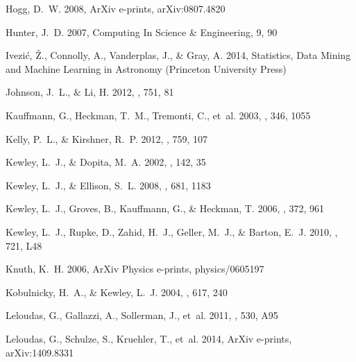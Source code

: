 \documentclass{emulateapj} \usepackage{amsmath} \usepackage{float}
\begin{document}
\begin{thebibliography}{}
{Hogg}, D.~W. 2008, ArXiv e-prints, arXiv:0807.4820

Hunter, J.~D. 2007, Computing In Science \& Engineering, 9, 90

{Ivezi{\'c}}, {\v Z}., {Connolly}, A., {Vanderplas}, J., \& {Gray}, A. 2014,
  Statistics, Data Mining and Machine Learning in Astronomy (Princeton
  University Press)

{Johnson}, J.~L., \& {Li}, H. 2012, \apj, 751, 81

{Kauffmann}, G., {Heckman}, T.~M., {Tremonti}, C., {et~al.} 2003, \mnras, 346,
  1055

{Kelly}, P.~L., \& {Kirshner}, R.~P. 2012, \apj, 759, 107

{Kewley}, L.~J., \& {Dopita}, M.~A. 2002, \apjs, 142, 35

{Kewley}, L.~J., \& {Ellison}, S.~L. 2008, \apj, 681, 1183

{Kewley}, L.~J., {Groves}, B., {Kauffmann}, G., \& {Heckman}, T. 2006, \mnras,
  372, 961

{Kewley}, L.~J., {Rupke}, D., {Zahid}, H.~J., {Geller}, M.~J., \& {Barton},
  E.~J. 2010, \apjl, 721, L48

{Knuth}, K.~H. 2006, ArXiv Physics e-prints, physics/0605197

{Kobulnicky}, H.~A., \& {Kewley}, L.~J. 2004, \apj, 617, 240

{Leloudas}, G., {Gallazzi}, A., {Sollerman}, J., {et~al.} 2011, \aap, 530, A95

{Leloudas}, G., {Schulze}, S., {Kruehler}, T., {et~al.} 2014, ArXiv e-prints,
  arXiv:1409.8331


\end{thebibliography}
\end{document}

